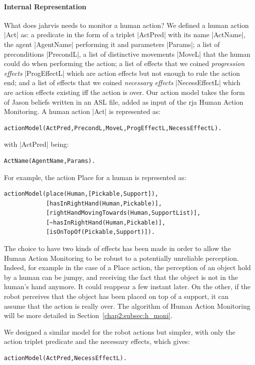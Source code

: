 \documentclass[a4paper,11pt,twoside]{StyleThese}
\begin{document}
\paragraph{Internal Representation}\label{chap2:par:act_rep}
What does \acrshort{jahrvis} needs to monitor a human action? We defined a human action |Act| as: a predicate in the form of a triplet |ActPred| with its name |ActName|, the agent |AgentName| performing it and parameters |Params|; a list of preconditions |PrecondL|, a list of distinctive movements |MoveL| that the human could do when performing the action; a list of effects that we coined \textit{progression effects} |ProgEffectL| which are action effects but not enough to rule the action end; and a list of effects that we coined \textit{necessary effects} |NecessEffectL| which are action effects existing iff the action is over. Our action model takes the form of Jason beliefs written in an ASL file, added as input of the \acrshort{rja} Human Action Monitoring. A human action |Act| is represented as:
\begin{lstlisting}[style=aslDef]
actionModel(ActPred,PrecondL,MoveL,ProgEffectL,NecessEffectL).
\end{lstlisting}

\noindent
with |ActPred| being:
\begin{lstlisting}[style=aslDef]
			ActName(AgentName,Params).
\end{lstlisting}

For example, the action Place for a human is represented as:
\begin{lstlisting}[style=aslDef]
actionModel(place(Human,[Pickable,Support]),
			[hasInRightHand(Human,Pickable)],
			[rightHandMovingTowards(Human,SupportList)],
			[~hasInRightHand(Human,Pickable)],
			[isOnTopOf(Pickable,Support)]).
\end{lstlisting}

The choice to have two kinds of effects has been made in order to allow the Human Action Monitoring to be robust to a potentially unreliable perception. Indeed, for example in the case of a Place action, the perception of an object hold by a human can be jumpy, and receiving the fact that the object is not in the human's hand anymore. It could reappear a few instant later. On the other, if the robot perceives that the object has been placed on top of a support, it can assume that the action is really over. The algorithm of Human Action Monitoring will be more detailed in Section~\ref{chap2:subsec:h_moni}.

We designed a similar model for the robot actions but simpler, with only the action triplet predicate and the necessary effects, which gives:
\begin{lstlisting}[style=aslDef]
			actionModel(ActPred,NecessEffectL).
\end{lstlisting}
\end{document}
